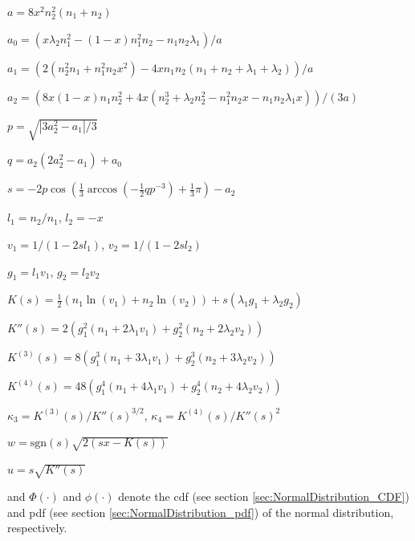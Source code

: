\begin{center}
	$a = 8 x^2 n_2^2 (n_1 + n_2)$
	
	\vspace{0.3cm}
	$a_0 = (x \lambda_2 n_1^2 - (1 - x) n_1^2 n_2 - n_1 n_2 \lambda_1) / a$
	
	\vspace{0.3cm}
	$a_1 = (2 (n_2^2 n_1 + n_1^2 n_2 x^2) - 4 x n_1 n_2 (n_1 + n_2 + \lambda_1 + \lambda_2)) / a$
	
	\vspace{0.3cm}
	$a_2 = (8 x (1 - x) n_1 n_2^2 + 4 x (n_2^3 + \lambda_2 n_2^2 - n_1^2 n_2 x - n_1 n_2 \lambda_1 x)) / (3 a)$
	
	\vspace{0.3cm}
	$ p = \sqrt{|3 a_2^2 - a_1| / 3}$
	
	\vspace{0.3cm}
	$ q = a_2 (2 a_2^2 - a_1) + a_0$
	
	\vspace{0.3cm}
	$ s = -2 p \cos \left(\tfrac{1}{3} \arccos(- \tfrac{1}{2}q p^{-3}) + \tfrac{1}{3} \pi \right ) - a_2$
	
	\vspace{0.3cm}
	$l_1 = n_2 / n_1$, $l_2 = -x$
	
	\vspace{0.3cm}
	$v_1 = 1 / (1 - 2 s l_1)$, $v_2 = 1 / (1 - 2 s l_2)$
	
	\vspace{0.3cm}
	$g_1 = l_1 v_1$, $g_2 = l_2 v_2$
	
	\vspace{0.3cm}
	$K(s) = \frac{1}{2} (n_1 \ln(v_1) + n_2 \ln(v_2)) + s (\lambda_1 g_1 + \lambda_2 g_2)$
	
	\vspace{0.3cm}
	$K''(s) = 2 (g_1^2(n_1 + 2 \lambda_1 v_1) + g_2^2(n_2 + 2 \lambda_2 v_2))$
	
	\vspace{0.3cm}
	$K^{(3)}(s)  = 8 (g_1^3 (n_1 + 3 \lambda_1 v_1) + g_2^3 (n_2 + 3 \lambda_2 v_2))$
	
	\vspace{0.3cm}
	$K^{(4)}(s)  = 48 (g_1^4 (n_1 + 4 \lambda_1 v_1) + g_2^4 (n_2 + 4 \lambda_2 v_2))$
	
	\vspace{0.3cm}
	$\kappa_3 = K^{(3)}(s) / K''(s) ^ {3/2}$, $\kappa_4 = K^{(4)}(s) / K''(s)^2$
	
	\vspace{0.3cm}
	$w = \text{sgn}(s) \sqrt{2 (s x - K(s))}$
	
	\vspace{0.3cm}
	$u = s \sqrt{K''(s)}$
\end{center}
and $\Phi(\cdot)$ and $\phi(\cdot)$ denote the cdf (see section \ref{sec:NormalDistribution_CDF}) and pdf (see section \ref{sec:NormalDistribution_pdf}) of the normal distribution, respectively.




